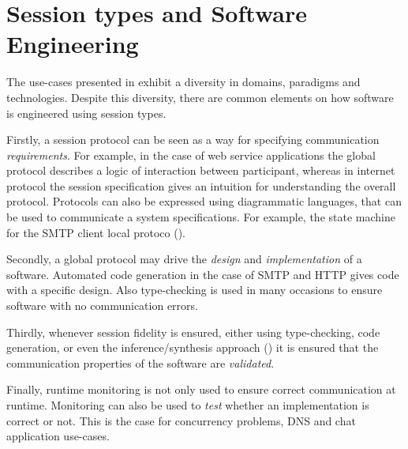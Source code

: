 \section{Session types and Software Engineering}
\label{sec:session_engineeering}



The use-cases presented in  exhibit a diversity
in domains, paradigms and technologies.
Despite this diversity, there are common elements on how software
is engineered using session types.

Firstly, a session protocol can be seen as a way for specifying
communication {\em requirements}. For example, in the case of web service applications
the global protocol describes a logic of interaction between participant,
whereas in internet protocol the session specification gives
an intuition for understanding the overall protocol. 
Protocols can also be expressed using diagrammatic languages,
that can be used to communicate a system specifications.
For example, the state machine for the SMTP client local protoco ().

Secondly, a global protocol may drive the {\em design} and
{\em implementation} of a software.
Automated code generation in the case of SMTP and HTTP
gives code with a specific design.
Also type-checking is used in many occasions to ensure
software with no communication errors.

Thirdly, whenever session fidelity is ensured, either
using type-checking, code generation, or even the
inference/synthesis approach ()
it is ensured that the communication properties of the
software are {\em validated}.

Finally, runtime monitoring is not only used to ensure
correct communication at runtime. Monitoring can also
be used to {\em test} whether an implementation
is correct or not.
This is the case for concurrency problems, DNS and
chat application use-cases.

